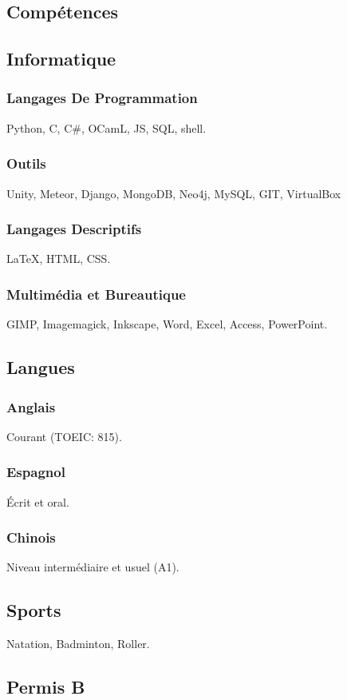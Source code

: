 \documentclass{article}
\begin{document}
\begin{multicols}{2}
        \columnbreak

        \section{Comp\'etences}
            \subsection{Informatique}
                \subsubsection{Langages De Programmation}
                    Python, C, C\#, OCamL, JS, SQL, shell.
                \subsubsection{Outils}
                    Unity, Meteor, Django,  MongoDB, Neo4j, MySQL, GIT, VirtualBox
                \subsubsection{Langages Descriptifs}
                    {\LaTeX}, HTML, CSS.
                \subsubsection{Multim\'edia et Bureautique}
                    GIMP, Imagemagick, Inkscape, Word, Excel, Access, PowerPoint.
            \subsection{Langues}
                \subsubsection{Anglais}
                    Courant (TOEIC: 815).
                \subsubsection{Espagnol}
                    \'Ecrit et oral.
                \subsubsection{Chinois}
                    Niveau interm\'ediaire et usuel (A1).
                \subsection{Sports}
                    Natation, Badminton, Roller.
                \subsection{Permis B}
    \end{multicols}
\end{document}
